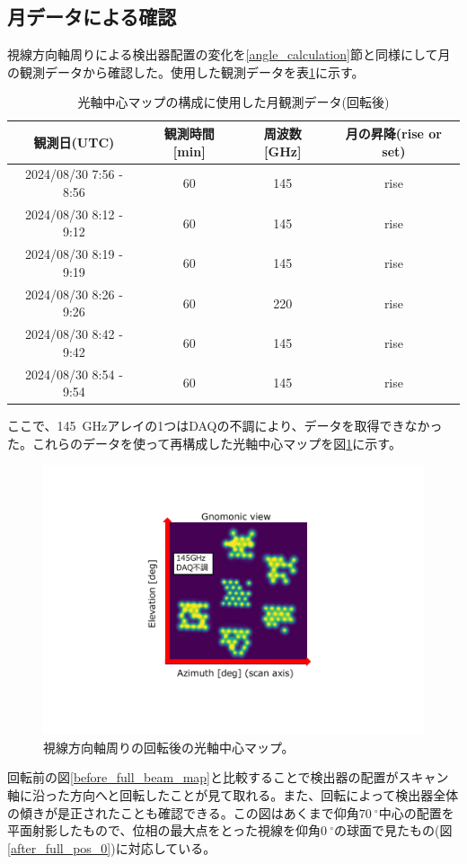 \subsection{月データによる確認}
\label{moon_ana}
視線方向軸周りによる検出器配置の変化を\ref{angle_calculation}節と同様にして月の観測データから確認した。使用した観測データを表\ref{after_full_array_table}に示す。
\begin{table}[htbp]
  \centering
  \caption{光軸中心マップの構成に使用した月観測データ(回転後)}
  \vspace{3mm}
  \begin{tabular}{cccc} \hline\hline
    観測日(UTC) & 観測時間 [min] & 周波数 [GHz] & 月の昇降(rise or set) \\ \hline
    2024/08/30 7:56 - 8:56 & 60 & 145 & rise \\
    2024/08/30 8:12 - 9:12 & 60 & 145 & rise \\
    2024/08/30 8:19 - 9:19 & 60 & 145 & rise \\
    2024/08/30 8:26 - 9:26 & 60 & 220 & rise \\
    2024/08/30 8:42 - 9:42 & 60 & 145 & rise \\
    2024/08/30 8:54 - 9:54 & 60 & 145 & rise \\ \hline\hline

  \end{tabular}
  \label{after_full_array_table}
\end{table}
ここで、\SI{145}{GHz}アレイの1つはDAQの不調により、データを取得できなかった。これらのデータを使って再構成した光軸中心マップを図\ref{after_full_beam_map}に示す。

\begin{figure}[htbp]
  \centering
  \includegraphics[width=0.75\columnwidth]{5_alignment/figs/after_full_gnomonic_mod.pdf}
  \caption{視線方向軸周りの回転後の光軸中心マップ。}
  \label{after_full_beam_map}
\end{figure}
回転前の図\ref{before_full_beam_map}と比較することで検出器の配置がスキャン軸に沿った方向へと回転したことが見て取れる。また、回転によって検出器全体の傾きが是正されたことも確認できる。この図はあくまで仰角$\SI{70}{^{\circ}}$中心の配置を平面射影したもので、位相の最大点をとった視線を仰角$\SI{0}{^{\circ}}$の球面で見たもの(図\ref{after_full_pos_0})に対応している。

